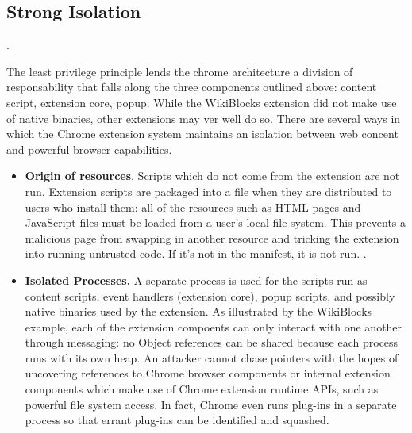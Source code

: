\documentclass[a4paper, 11pt]{article} %
\begin{document}
\subsection{Strong Isolation}. 

The least privilege principle lends the chrome architecture a division of responsability that falls along the three components outlined above: content script, extension core, popup. While the WikiBlocks extension did not make use of native binaries, other extensions may ver well do so. There are several ways in which the Chrome extension system maintains an isolation between web concent and powerful browser capabilities.

\begin{itemize}
	\item \textbf{Origin of resources}. Scripts which do not come from the extension are not run. Extension scripts are packaged into a file when they are distributed to users who install them: all of the resources such as HTML pages and JavaScript files must be loaded from a user's local file system. This prevents a malicious page from swapping in another resource and tricking the extension into running untrusted code. If it's not in the manifest, it is not run. \cite{38394}.
	
	\item \textbf{Isolated Processes.} A separate process is used for the scripts run as content scripts, event handlers (extension core), popup scripts, and possibly native binaries used by the extension. As illustrated by the WikiBlocks example, each of the extension compoents can only interact with one another through messaging: no Object references can be shared because each process runs with its own heap. An attacker cannot chase pointers with the hopes of uncovering references to Chrome browser components or internal extension components which make use of Chrome extension runtime APIs, such as powerful file system access. In fact, Chrome even runs plug-ins in a separate process so that errant plug-ins can be identified and squashed. \cite{20-things} 
\end{itemize}
\end{document}
